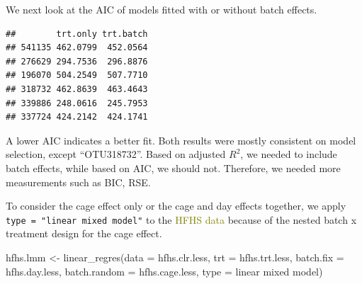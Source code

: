 \documentclass[
]{book}
\newenvironment{Shaded}{\begin{snugshade}}{\end{snugshade}}
\newcommand{\AttributeTok}[1]{\textcolor[rgb]{0.77,0.63,0.00}{#1}}
\newcommand{\ControlFlowTok}[1]{\textcolor[rgb]{0.13,0.29,0.53}{\textbf{#1}}}
\newcommand{\DecValTok}[1]{\textcolor[rgb]{0.00,0.00,0.81}{#1}}
\newcommand{\FunctionTok}[1]{\textcolor[rgb]{0.00,0.00,0.00}{#1}}
\newcommand{\NormalTok}[1]{#1}
\newcommand{\OtherTok}[1]{\textcolor[rgb]{0.56,0.35,0.01}{#1}}
\newcommand{\SpecialCharTok}[1]{\textcolor[rgb]{0.00,0.00,0.00}{#1}}
\newcommand{\StringTok}[1]{\textcolor[rgb]{0.31,0.60,0.02}{#1}}
\begin{document}
We next look at the AIC of models fitted with or without batch effects.

\begin{Shaded}
\end{Shaded}

\begin{verbatim}
##        trt.only trt.batch
## 541135 462.0799  452.0564
## 276629 294.7536  296.8876
## 196070 504.2549  507.7710
## 318732 462.8639  463.4643
## 339886 248.0616  245.7953
## 337724 424.2142  424.1741
\end{verbatim}

A lower AIC indicates a better fit. Both results were mostly consistent on model selection, except ``OTU318732''. Based on adjusted \(R^2\), we needed to include batch effects, while based on AIC, we should not. Therefore, we needed more measurements such as BIC, RSE.

To consider the cage effect only or the cage and day effects together, we apply \texttt{type\ =\ "linear\ mixed\ model"} to the \textcolor{olive}{HFHS data} because of the nested batch x treatment design for the cage effect.

\begin{Shaded}
\begin{Highlighting}[]
\NormalTok{hfhs.lmm }\OtherTok{\textless{}{-}} \FunctionTok{linear\_regres}\NormalTok{(}\AttributeTok{data =}\NormalTok{ hfhs.clr.less, }
                          \AttributeTok{trt =}\NormalTok{ hfhs.trt.less, }
                          \AttributeTok{batch.fix =}\NormalTok{ hfhs.day.less, }
                          \AttributeTok{batch.random =}\NormalTok{ hfhs.cage.less,}
                          \AttributeTok{type =} \StringTok{\textquotesingle{}linear mixed model\textquotesingle{}}\NormalTok{)}
\end{Highlighting}
\end{Shaded}

\begin{Shaded}
\end{Shaded}
\end{document}

